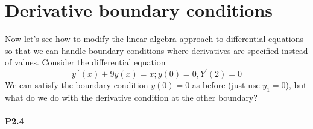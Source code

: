 \section*{Derivative boundary conditions}
	Now let\rq s see how to modify the linear algebra approach to differential equations
so that we can handle boundary conditions where derivatives are specified instead
of values. Consider the differential equation
	\begin{equation}\label{eq:28}
		y^{\prime\prime}(x) + 9y(x) = x   ;    y(0) = 0,    Y^\prime(2) = 0
	\end{equation}
	We can satisfy the boundary condition $y(0) = 0$ as before (just use $y_1 = 0$), but
what do we do with the derivative condition at the other boundary?
\paragraph*{P2.4}
